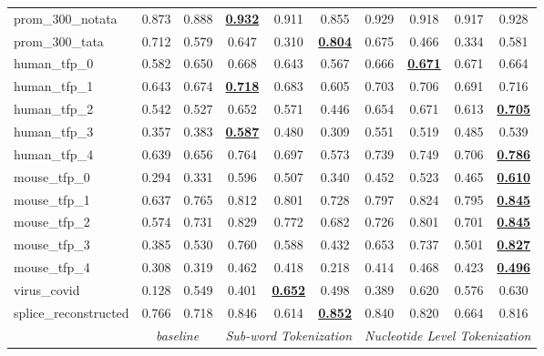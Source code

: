 \begin{table*}[h!]
\begin{center}
\begin{tabular}{l|cc|ccc|cccc}
prom\_300\_notata & 0.873 & 0.888 & {\ul \textbf{0.932}} & 0.911 & 0.855 & 0.929 & 0.918 & 0.917 & 0.928 \\
prom\_300\_tata & 0.712 & 0.579 & 0.647 & 0.310 & {\ul \textbf{0.804}} & 0.675 & 0.466 & 0.334 & 0.581 \\
human\_tfp\_0 & 0.582 & 0.650 & 0.668 & 0.643 & 0.567 & 0.666 & {\ul \textbf{0.671}} & 0.671 & 0.664 \\
human\_tfp\_1 & 0.643 & 0.674 & {\ul \textbf{0.718}} & 0.683 & 0.605 & 0.703 & 0.706 & 0.691 & 0.716 \\
human\_tfp\_2 & 0.542 & 0.527 & 0.652 & 0.571 & 0.446 & 0.654 & 0.671 & 0.613 & {\ul \textbf{0.705}} \\
human\_tfp\_3 & 0.357 & 0.383 & {\ul \textbf{0.587}} & 0.480 & 0.309 & 0.551 & 0.519 & 0.485 & 0.539 \\
human\_tfp\_4 & 0.639 & 0.656 & 0.764 & 0.697 & 0.573 & 0.739 & 0.749 & 0.706 & {\ul \textbf{0.786}} \\
mouse\_tfp\_0 & 0.294 & 0.331 & 0.596 & 0.507 & 0.340 & 0.452 & 0.523 & 0.465 & {\ul \textbf{0.610}} \\
mouse\_tfp\_1 & 0.637 & 0.765 & 0.812 & 0.801 & 0.728 & 0.797 & 0.824 & 0.795 & {\ul \textbf{0.845}} \\
mouse\_tfp\_2 & 0.574 & 0.731 & 0.829 & 0.772 & 0.682 & 0.726 & 0.801 & 0.701 & {\ul \textbf{0.845}} \\
mouse\_tfp\_3 & 0.385 & 0.530 & 0.760 & 0.588 & 0.432 & 0.653 & 0.737 & 0.501 & {\ul \textbf{0.827}} \\
mouse\_tfp\_4 & 0.308 & 0.319 & 0.462 & 0.418 & 0.218 & 0.414 & 0.468 & 0.423 & {\ul \textbf{0.496}} \\
virus\_covid & 0.128 & 0.549 & 0.401 & {\ul \textbf{0.652}} & 0.498 & 0.389 & 0.620 & 0.576 & 0.630 \\
splice\_reconstructed & 0.766 & 0.718 & 0.846 & 0.614 & {\ul \textbf{0.852}} & 0.840 & 0.820 & 0.664 & 0.816 \\
\hline
\multicolumn{1}{l|}{} & \multicolumn{2}{c|}{\textit{baseline}} & \multicolumn{3}{c|}{\textit{Sub-word Tokenization}} & \multicolumn{4}{c}{\textit{Nucleotide Level Tokenization}} \\ \hline
\end{tabular}
\end{center}
\end{table*}